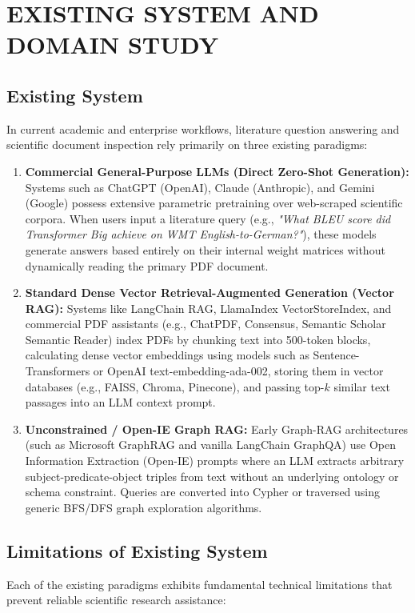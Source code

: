 \documentclass[12pt,a4paper,oneside]{report}
\begin{document}



\chapter{EXISTING SYSTEM AND DOMAIN STUDY}

\section{Existing System}
In current academic and enterprise workflows, literature question answering and scientific document inspection rely primarily on three existing paradigms:
\begin{enumerate}
    \item \textbf{Commercial General-Purpose LLMs (Direct Zero-Shot Generation):} Systems such as ChatGPT (OpenAI), Claude (Anthropic), and Gemini (Google) possess extensive parametric pretraining over web-scraped scientific corpora. When users input a literature query (e.g., \textit{"What BLEU score did Transformer Big achieve on WMT English-to-German?"}), these models generate answers based entirely on their internal weight matrices without dynamically reading the primary PDF document.
    \item \textbf{Standard Dense Vector Retrieval-Augmented Generation (Vector RAG):} Systems like LangChain RAG, LlamaIndex VectorStoreIndex, and commercial PDF assistants (e.g., ChatPDF, Consensus, Semantic Scholar Semantic Reader) index PDFs by chunking text into 500-token blocks, calculating dense vector embeddings using models such as Sentence-Transformers or OpenAI text-embedding-ada-002, storing them in vector databases (e.g., FAISS, Chroma, Pinecone), and passing top-$k$ similar text passages into an LLM context prompt.
    \item \textbf{Unconstrained / Open-IE Graph RAG:} Early Graph-RAG architectures (such as Microsoft GraphRAG and vanilla LangChain GraphQA) use Open Information Extraction (Open-IE) prompts where an LLM extracts arbitrary subject-predicate-object triples from text without an underlying ontology or schema constraint. Queries are converted into Cypher or traversed using generic BFS/DFS graph exploration algorithms.
\end{enumerate}

\section{Limitations of Existing System}
Each of the existing paradigms exhibits fundamental technical limitations that prevent reliable scientific research assistance:
\end{document}
